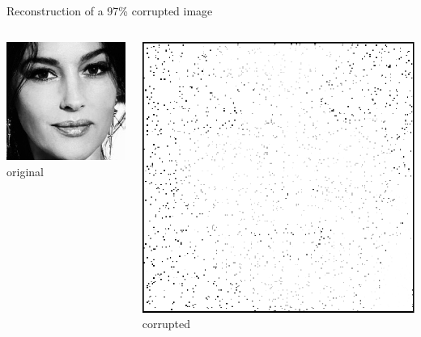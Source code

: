 \documentclass[10pt,american,ignorenonframetext,aspectratio=1610]{beamer}
\theoremstyle{remark}
\begin{document}
\begin{frame}{Reconstruction of a 97\% corrupted image}
\protect\hypertarget{reconstruction-of-a-97-corrupted-image}{}

\begin{columns}[T]
\begin{column}{0.3\textwidth}
\centering

\includegraphics{img/img_original.jpg} original
\end{column}

\begin{column}{0.3\textwidth}
\centering

\includegraphics{img/img_corrupted.png} corrupted
\end{column}


\end{columns}
\end{frame}
\end{document}
